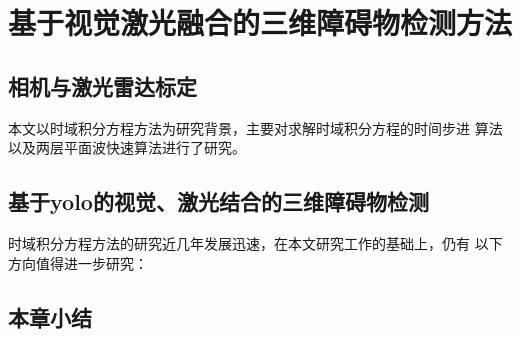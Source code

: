 
\chapter{基于视觉激光融合的三维障碍物检测方法}

\section{相机与激光雷达标定}
本文以时域积分方程方法为研究背景，主要对求解时域积分方程的时间步进
算法以及两层平面波快速算法进行了研究。

\section{基于yolo的视觉、激光结合的三维障碍物检测}
时域积分方程方法的研究近几年发展迅速，在本文研究工作的基础上，仍有
以下方向值得进一步研究：

\section{本章小结}